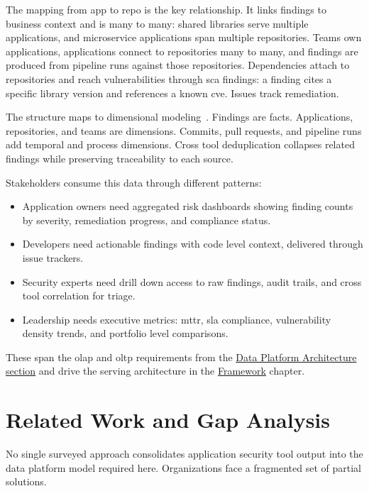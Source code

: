 The mapping from app to repo is the key relationship. It links findings to business context and is many to many: shared libraries serve multiple applications, and microservice applications span multiple repositories. Teams own applications, applications connect to repositories many to many, and findings are produced from pipeline runs against those repositories. Dependencies attach to repositories and reach vulnerabilities through \gls{sca} findings: a finding cites a specific library version and references a known \gls{cve}. Issues track remediation.

The structure maps to dimensional modeling~\cite{Kimball2013}. Findings are facts. Applications, repositories, and teams are dimensions. Commits, pull requests, and pipeline runs add temporal and process dimensions. Cross tool deduplication collapses related findings while preserving traceability to each source.

Stakeholders consume this data through different patterns:
\begin{itemize}
    \item Application owners need aggregated risk dashboards showing finding counts by severity, remediation progress, and compliance status.
    \item Developers need actionable findings with code level context, delivered through issue trackers.
    \item Security experts need drill down access to raw findings, audit trails, and cross tool correlation for triage.
    \item Leadership needs executive metrics: \gls{mttr}, \gls{sla} compliance, vulnerability density trends, and portfolio level comparisons.
\end{itemize}
These span the \gls{olap} and \gls{oltp} requirements from the \hyperref[sec:data-architecture]{Data Platform Architecture section} and drive the serving architecture in the \hyperref[ch:framework]{Framework} chapter.


\section{Related Work and Gap Analysis}
\label{sec:related-work}

No single surveyed approach consolidates application security tool output into the data platform model required here. Organizations face a fragmented set of partial solutions.

